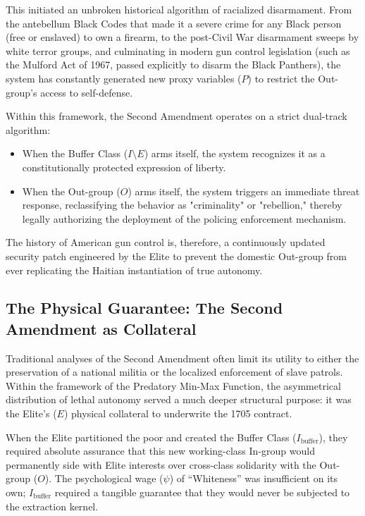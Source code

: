 This initiated an unbroken historical algorithm of racialized disarmament. From the antebellum Black Codes that made it a severe crime for any Black person (free or enslaved) to own a firearm, to the post-Civil War disarmament sweeps by white terror groups, and culminating in modern gun control legislation (such as the Mulford Act of 1967, passed explicitly to disarm the Black Panthers), the system has constantly generated new proxy variables ($P$) to restrict the Out-group's access to self-defense.

Within this framework, the Second Amendment operates on a strict dual-track algorithm:
\begin{itemize}
    \item When the Buffer Class ($I \setminus E$) arms itself, the system recognizes it as a constitutionally protected expression of liberty.
    \item When the Out-group ($O$) arms itself, the system triggers an immediate threat response, reclassifying the behavior as "criminality" or "rebellion," thereby legally authorizing the deployment of the policing enforcement mechanism.
\end{itemize}

The history of American gun control is, therefore, a continuously updated security patch engineered by the Elite to prevent the domestic Out-group from ever replicating the Haitian instantiation of true autonomy.

\subsection{The Physical Guarantee: The Second Amendment as Collateral}

Traditional analyses of the Second Amendment often limit its utility to either the preservation of a national militia or the localized enforcement of slave patrols. Within the framework of the Predatory Min-Max Function, the asymmetrical distribution of lethal autonomy served a much deeper structural purpose: it was the Elite's ($E$) physical collateral to underwrite the 1705 contract.

When the Elite partitioned the poor and created the Buffer Class ($I_{\text{buffer}}$), they required absolute assurance that this new working-class In-group would permanently side with Elite interests over cross-class solidarity with the Out-group ($O$). The psychological wage ($\psi$) of ``Whiteness'' was insufficient on its own; $I_{\text{buffer}}$ required a tangible guarantee that they would never be subjected to the extraction kernel.

